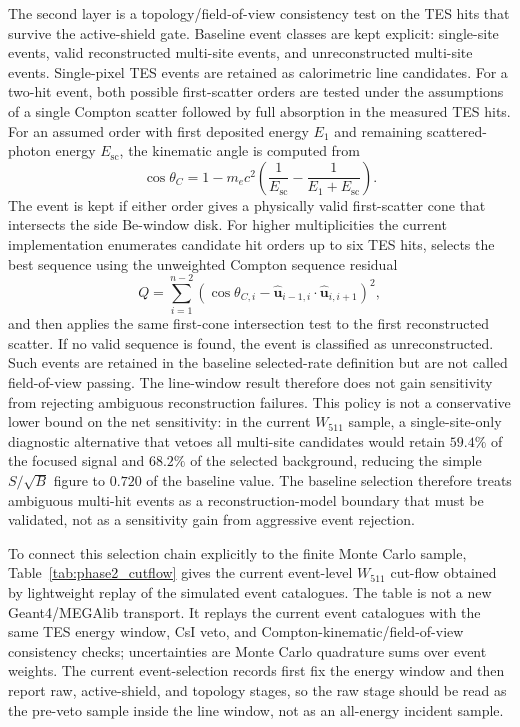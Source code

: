 \documentclass[pdflatex,sn-mathphys-num]{sn-jnl}
\newcommand{\wii}{W_{511}}
\newcommand{\added}[1]{{#1}}
\begin{document}
The second layer is a topology/field-of-view consistency test on the TES hits
that survive the active-shield gate. Baseline event classes are kept explicit:
single-site events, valid reconstructed multi-site events, and unreconstructed
multi-site events. Single-pixel TES events are retained as calorimetric line
candidates. For a two-hit event, both possible first-scatter orders are tested
under the assumptions of a single Compton scatter followed by full absorption
in the measured TES hits. For an assumed order with first deposited energy
$E_1$ and remaining scattered-photon energy $E_{\mathrm{sc}}$, the kinematic
angle is computed from
\begin{equation}
  \cos\theta_C =
  1 - m_ec^2\left(\frac{1}{E_{\mathrm{sc}}}
  - \frac{1}{E_1+E_{\mathrm{sc}}}\right).
\end{equation}
The event is kept if either order gives a physically valid first-scatter cone
that intersects the side Be-window disk. For higher multiplicities the current
implementation enumerates candidate hit orders up to six TES hits, selects the
best sequence using the unweighted Compton sequence residual
\begin{equation}
  Q = \sum_{i=1}^{n-2}
  \left(\cos\theta_{C,i} -
  \hat{\mathbf u}_{i-1,i}\cdot\hat{\mathbf u}_{i,i+1}\right)^2,
\end{equation}
and then applies the same first-cone intersection test to the first reconstructed
scatter. If no valid sequence is found, the event is classified as
unreconstructed. Such events are retained in the baseline selected-rate
definition but are not called field-of-view passing. The line-window result
therefore does not gain sensitivity from rejecting ambiguous reconstruction
failures. This policy is not a conservative lower bound on the net sensitivity:
in the current $\wii$ sample, a single-site-only diagnostic alternative that
vetoes all multi-site candidates would retain $59.4\%$ of the focused signal
and $68.2\%$ of the selected background, reducing the simple $S/\sqrt{B}$
figure to $0.720$ of the baseline value. The baseline selection therefore treats ambiguous
multi-hit events as a reconstruction-model boundary that must be validated, not
as a sensitivity gain from aggressive event rejection.

\added{To connect this selection chain explicitly to the finite Monte Carlo
sample, Table~\ref{tab:phase2_cutflow} gives the current event-level
$\wii$ cut-flow obtained by lightweight replay of the simulated event catalogues.
The table is not a new Geant4/MEGAlib transport. It replays the current
event catalogues with the same TES energy window, CsI veto, and
Compton-kinematic/field-of-view consistency checks; uncertainties are Monte
Carlo quadrature sums over event weights. The current event-selection records first fix
the energy window and then report raw, active-shield, and topology stages, so
the raw stage should be read as the pre-veto sample inside the line window, not
as an all-energy incident sample.}
\end{document}
